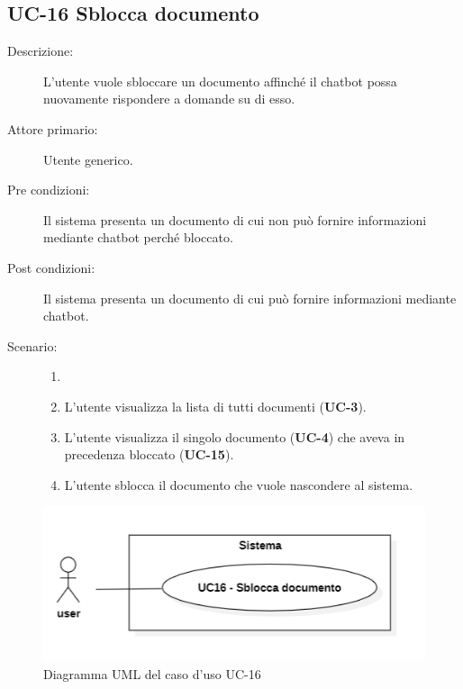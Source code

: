 \subsection{UC-16 Sblocca documento}
\begin{description}
    \item[Descrizione:] L'utente vuole sbloccare un documento affinché il chatbot possa nuovamente rispondere a domande su di esso.
    \item[Attore primario:] Utente generico.
    \item[Pre condizioni:] Il sistema presenta un documento di cui non può fornire informazioni mediante chatbot perché bloccato.
    \item[Post condizioni:] Il sistema presenta un documento di cui può fornire informazioni mediante chatbot.
    \newpage
    \item[Scenario:]
    \begin{enumerate}
        \item[]
        \item L’utente visualizza la lista di tutti documenti (\textbf{UC-3}).
        \item L'utente visualizza il singolo documento  (\textbf{UC-4}) che aveva in precedenza bloccato (\textbf{UC-15}).
        \item L'utente sblocca il documento che vuole nascondere al sistema.
    \end{enumerate}
\end{description}

\begin{figure}[H]
    \centering
    \includegraphics[width=0.8\linewidth]{UC16.PNG}
    \caption{Diagramma UML del caso d'uso UC-16}
    \label{fig:UC16}
\end{figure}

